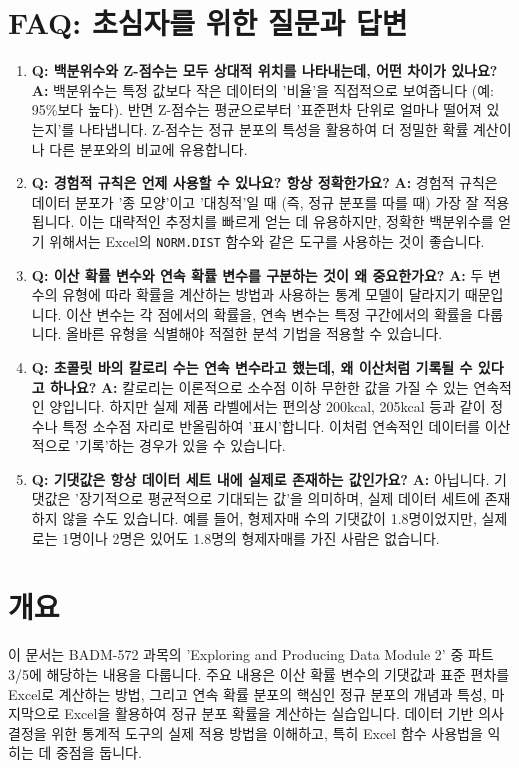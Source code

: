 \documentclass[11pt,a4paper]{article}
\theoremstyle{definition}
\begin{document}
\newpage
\section{FAQ: 초심자를 위한 질문과 답변}

\begin{enumerate}
    \item \textbf{Q: 백분위수와 Z-점수는 모두 상대적 위치를 나타내는데, 어떤 차이가 있나요?}
    \textbf{A:} 백분위수는 특정 값보다 작은 데이터의 '비율'을 직접적으로 보여줍니다 (예: 95\%보다 높다). 반면 Z-점수는 평균으로부터 '표준편차 단위로 얼마나 떨어져 있는지'를 나타냅니다. Z-점수는 정규 분포의 특성을 활용하여 더 정밀한 확률 계산이나 다른 분포와의 비교에 유용합니다.

    \item \textbf{Q: 경험적 규칙은 언제 사용할 수 있나요? 항상 정확한가요?}
    \textbf{A:} 경험적 규칙은 데이터 분포가 '종 모양'이고 '대칭적'일 때 (즉, 정규 분포를 따를 때) 가장 잘 적용됩니다. 이는 대략적인 추정치를 빠르게 얻는 데 유용하지만, 정확한 백분위수를 얻기 위해서는 Excel의 \texttt{NORM.DIST} 함수와 같은 도구를 사용하는 것이 좋습니다.

    \item \textbf{Q: 이산 확률 변수와 연속 확률 변수를 구분하는 것이 왜 중요한가요?}
    \textbf{A:} 두 변수의 유형에 따라 확률을 계산하는 방법과 사용하는 통계 모델이 달라지기 때문입니다. 이산 변수는 각 점에서의 확률을, 연속 변수는 특정 구간에서의 확률을 다룹니다. 올바른 유형을 식별해야 적절한 분석 기법을 적용할 수 있습니다.

    \item \textbf{Q: 초콜릿 바의 칼로리 수는 연속 변수라고 했는데, 왜 이산처럼 기록될 수 있다고 하나요?}
    \textbf{A:} 칼로리는 이론적으로 소수점 이하 무한한 값을 가질 수 있는 연속적인 양입니다. 하지만 실제 제품 라벨에서는 편의상 200kcal, 205kcal 등과 같이 정수나 특정 소수점 자리로 반올림하여 '표시'합니다. 이처럼 연속적인 데이터를 이산적으로 '기록'하는 경우가 있을 수 있습니다.

    \item \textbf{Q: 기댓값은 항상 데이터 세트 내에 실제로 존재하는 값인가요?}
    \textbf{A:} 아닙니다. 기댓값은 '장기적으로 평균적으로 기대되는 값'을 의미하며, 실제 데이터 세트에 존재하지 않을 수도 있습니다. 예를 들어, 형제자매 수의 기댓값이 1.8명이었지만, 실제로는 1명이나 2명은 있어도 1.8명의 형제자매를 가진 사람은 없습니다.
\end{enumerate}

\newpage
\section{개요}
이 문서는 BADM-572 과목의 'Exploring and Producing Data Module 2' 중 파트 3/5에 해당하는 내용을 다룹니다.
주요 내용은 이산 확률 변수의 기댓값과 표준 편차를 Excel로 계산하는 방법, 그리고 연속 확률 분포의 핵심인 정규 분포의 개념과 특성, 마지막으로 Excel을 활용하여 정규 분포 확률을 계산하는 실습입니다.
데이터 기반 의사 결정을 위한 통계적 도구의 실제 적용 방법을 이해하고, 특히 Excel 함수 사용법을 익히는 데 중점을 둡니다.
\end{document}
